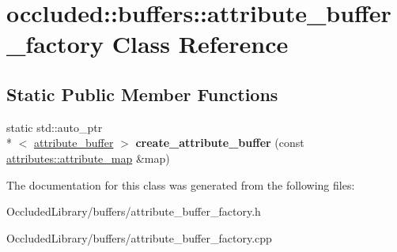 \hypertarget{classoccluded_1_1buffers_1_1attribute__buffer__factory}{\section{occluded\+:\+:buffers\+:\+:attribute\+\_\+buffer\+\_\+factory Class Reference}
\label{classoccluded_1_1buffers_1_1attribute__buffer__factory}
}
\subsection*{Static Public Member Functions}
\begin{DoxyCompactItemize}
\item 
\hypertarget{classoccluded_1_1buffers_1_1attribute__buffer__factory_a3bc5d7f71d7264101642207c0c4f102c}{static std\+::auto\+\_\+ptr\\*
$<$ \hyperlink{classoccluded_1_1buffers_1_1attribute__buffer}{attribute\+\_\+buffer} $>$ {\bfseries create\+\_\+attribute\+\_\+buffer} (const \hyperlink{classoccluded_1_1buffers_1_1attributes_1_1attribute__map}{attributes\+::attribute\+\_\+map} \&map)}\label{classoccluded_1_1buffers_1_1attribute__buffer__factory_a3bc5d7f71d7264101642207c0c4f102c}

\end{DoxyCompactItemize}


The documentation for this class was generated from the following files\+:\begin{DoxyCompactItemize}
\item 
Occluded\+Library/buffers/attribute\+\_\+buffer\+\_\+factory.\+h\item 
Occluded\+Library/buffers/attribute\+\_\+buffer\+\_\+factory.\+cpp\end{DoxyCompactItemize}
